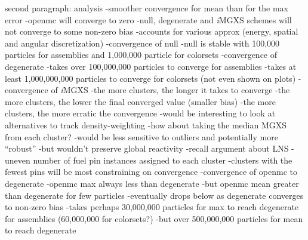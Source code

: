 second paragraph: analysis
-smoother convergence for mean than for the max error
-openmc will converge to zero
-null, degenerate and \textit{i}\ac{MGXS} schemes will not converge to some non-zero bias
  -accounts for various approx (energy, spatial and angular discretization)
-convergence of null
  -null is stable with 100,000 particles for assemblies and 1,000,000 particle for colorsets
-convergence of degenerate
  -takes over 100,000,000 particles to converge for assemblies
  -takes at least 1,000,000,000 particles to converge for colorsets (not even shown on plots)
-convergence of \textit{i}\ac{MGXS}
  -the more clusters, the longer it takes to converge
  -the more clusters, the lower the final converged value (smaller bias)
  -the more clusters, the more erratic the convergence
    -would be interesting to look at alternatives to track density-weighting
    -how about taking the median MGXS from each cluster?
      -would be less sensitive to outliers and potentially more ``robust''
      -but wouldn't preserve global reactivity
    -recall argument about LNS - uneven number of fuel pin instances assigned to each cluster
      -clusters with the fewest pins will be most constraining on convergence
-convergence of openmc to degenerate
  -openmc max always less than degenerate
  -but openmc mean greater than degenerate for few particles
    -eventually drops below as degenerate converges to non-zero bias
  -takes perhaps 30,000,000 particles for max to reach degenerate for assemblies (60,000,000 for colorsets?)
  -but over 500,000,000 particles for mean to reach degenerate

